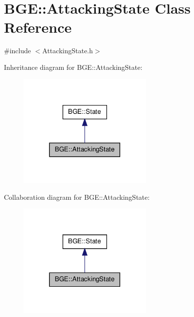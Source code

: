 \hypertarget{class_b_g_e_1_1_attacking_state}{\section{B\-G\-E\-:\-:Attacking\-State Class Reference}
\label{class_b_g_e_1_1_attacking_state}
}


{\ttfamily \#include $<$Attacking\-State.\-h$>$}



Inheritance diagram for B\-G\-E\-:\-:Attacking\-State\-:
\nopagebreak
\begin{figure}[H]
\begin{center}
\leavevmode
\includegraphics[width=188pt]{class_b_g_e_1_1_attacking_state__inherit__graph}
\end{center}
\end{figure}


Collaboration diagram for B\-G\-E\-:\-:Attacking\-State\-:
\nopagebreak
\begin{figure}[H]
\begin{center}
\leavevmode
\includegraphics[width=188pt]{class_b_g_e_1_1_attacking_state__coll__graph}
\end{center}
\end{figure}
